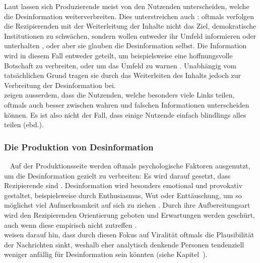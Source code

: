 \documentclass[12pt,a4paper]{article}        %
\begin{document}
Laut \textcite[3]{tandoc_jr_facts_2019} lassen sich Produzierende meist von den Nutzenden unterscheiden, welche die Desinformation weiterverbreiten. Dies unterstreichen auch \textcite[77]{lecheler_disinformation_2022}: oftmals verfolgen die Rezipierenden mit der Weiterleitung der Inhalte nicht das Ziel, demokratische Institutionen zu schwächen, sondern wollen entweder ihr Umfeld informieren oder unterhalten \parencite[bspw.]{subramanian_meet_2017}, oder aber sie glauben die Desinformation selbst. Die Information wird in diesem Fall entweder geteilt, um beispielsweise eine hoffnungsvolle Botschaft zu verbreiten, oder um das Umfeld zu warnen \parencite[182]{weidner_fake_2019}. Unabhängig vom tatsächlichen Grund tragen sie durch das Weiterleiten des Inhalts jedoch zur Verbreitung der Desinformation bei.\\
\textcite[2]{guess_less_2019} zeigen ausserdem, dass die Nutzenden, welche besonders viele Links teilen, oftmals auch besser zwischen wahren und falschen Informationen unterscheiden können. Es ist also nicht der Fall, dass einige Nutzende einfach blindlings alles teilen (ebd.).

\subsubsection{Die Produktion von Desinformation}
~\label{theory_production}
Auf der Produktionsseite werden oftmals psychologische Faktoren ausgenutzt, um die Desinformation gezielt zu verbreiten: Es wird darauf gesetzt, dass Rezipierende  sind \parencite[8]{burkhardt_history_2017}. Desinformation wird besonders emotional und provokativ gestaltet, beispielsweise durch Enthusiasmus, Wut oder Enttäuschung, um so möglichst viel Aufmerksamkeit auf sich zu ziehen \parencites[42]{levak_disinformation_2020}[18]{grujic_warnhinweise_2024}[5]{tandoc_jr_facts_2019}[170]{wahl_fake_2021}. Durch ihre Aufbereitungsart wird den Rezipierenden Orientierung geboten und Erwartungen werden geschürt, auch wenn diese empirisch nicht zutreffen \parencite[152]{marx_fake_2020}. \\
\textcite[45]{pennycook_lazy_2019} weisen darauf hin, dass durch diesen Fokus auf Viralität oftmals die Plausibilität der Nachrichten sinkt, weshalb eher analytisch denkende Personen tendenziell weniger anfällig für Desinformation sein könnten (siehe Kapitel~).
\end{document}
